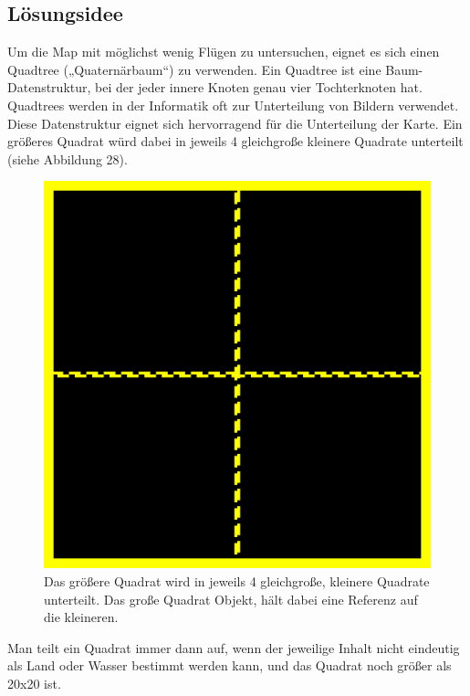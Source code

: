 \documentclass[a4paper,12pt]{article}
\begin{document}
\subsection{Lösungsidee}
Um die Map mit möglichst wenig Flügen zu untersuchen, eignet es sich einen Quadtree („Quaternärbaum“) zu verwenden. Ein Quadtree ist eine Baum-Datenstruktur, bei der jeder innere Knoten genau vier Tochterknoten hat. Quadtrees werden in der Informatik oft zur Unterteilung von Bildern verwendet.
\\[0.4cm]
Diese Datenstruktur eignet sich hervorragend für die Unterteilung der Karte. Ein größeres Quadrat würd dabei in jeweils 4 gleichgroße kleinere Quadrate unterteilt (siehe Abbildung 28).
\begin{figure}[H]
\centering
    \includegraphics[width=0.5\linewidth]{Bilder/Aufgabe3/Quadtree_Einfach.png}
    \caption{Das größere Quadrat wird in jeweils 4 gleichgroße, kleinere Quadrate unterteilt. Das große Quadrat Objekt, hält dabei eine Referenz auf die kleineren.}
\end{figure}

Man teilt ein Quadrat immer dann auf, wenn der jeweilige Inhalt nicht eindeutig als Land oder Wasser bestimmt werden kann, und das Quadrat noch größer als 20x20 ist.
\end{document}

